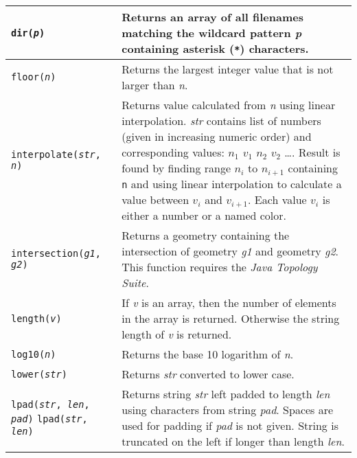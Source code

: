\begin{longtable}{|p{5cm}|p{7cm}|}
\hline

\texttt{dir(\textit{p})} &
Returns an array of all filenames matching the wildcard
pattern \textit{p} containing asterisk (\texttt{*}) characters. \\

\hline

\texttt{floor(\textit{n})} &
Returns the largest integer value that is not larger than \textit{n}. \\

\hline

\texttt{interpolate(\textit{str}, \textit{n})} &
Returns value calculated from \textit{n} using linear interpolation.
\textit{str} contains list of numbers (given in increasing numeric
order) and corresponding values:
$n_{1}$ $v_{1}$ $n_{2}$ $v_{2}$ \ldots.
Result is found by finding range
$n_{i}$
to
$n_{i+1}$
containing \texttt{n} and
using linear interpolation to calculate a value between
$v_{i}$
and
$v_{i+1}$.
Each value $v_{i}$ is either a number or a named color.  \\

\hline

\texttt{intersection(\textit{g1}, \textit{g2})} &
Returns a geometry containing the intersection
of geometry \textit{g1} and geometry \textit{g2}.
This function requires the \textit{Java Topology Suite}. \\

\hline

\texttt{length(\textit{v})} &
If \textit{v} is an array, then the number of elements in the
array is returned.  Otherwise the string length of \textit{v} is returned. \\

\hline

\texttt{log10(\textit{n})} &
Returns the base 10 logarithm of \textit{n}. \\

\hline

\texttt{lower(\textit{str})} &
Returns \textit{str} converted to lower case. \\

\hline

\texttt{lpad(\textit{str}, \textit{len}, \textit{pad})}
\texttt{lpad(\textit{str}, \textit{len})} &
Returns string \textit{str} left padded to length \textit{len}
using characters from string \textit{pad}.
Spaces are used for padding if \textit{pad} is not given.
String is truncated on the left if longer than length \textit{len}. \\


\end{longtable}

